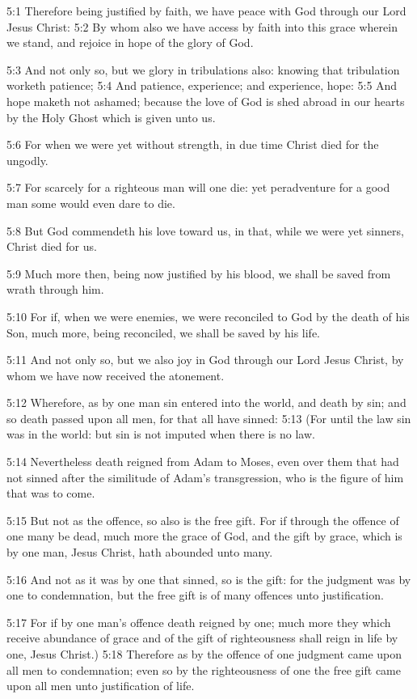 5:1 Therefore being justified by faith, we have peace with God through
our Lord Jesus Christ: 5:2 By whom also we have access by faith into
this grace wherein we stand, and rejoice in hope of the glory of God.

5:3 And not only so, but we glory in tribulations also: knowing that
tribulation worketh patience; 5:4 And patience, experience; and
experience, hope: 5:5 And hope maketh not ashamed; because the love of
God is shed abroad in our hearts by the Holy Ghost which is given unto
us.

5:6 For when we were yet without strength, in due time Christ died for
the ungodly.

5:7 For scarcely for a righteous man will one die: yet peradventure
for a good man some would even dare to die.

5:8 But God commendeth his love toward us, in that, while we were yet
sinners, Christ died for us.

5:9 Much more then, being now justified by his blood, we shall be
saved from wrath through him.

5:10 For if, when we were enemies, we were reconciled to God by the
death of his Son, much more, being reconciled, we shall be saved by
his life.

5:11 And not only so, but we also joy in God through our Lord Jesus
Christ, by whom we have now received the atonement.

5:12 Wherefore, as by one man sin entered into the world, and death by
sin; and so death passed upon all men, for that all have sinned: 5:13
(For until the law sin was in the world: but sin is not imputed when
there is no law.

5:14 Nevertheless death reigned from Adam to Moses, even over them
that had not sinned after the similitude of Adam's transgression, who
is the figure of him that was to come.

5:15 But not as the offence, so also is the free gift. For if through
the offence of one many be dead, much more the grace of God, and the
gift by grace, which is by one man, Jesus Christ, hath abounded unto
many.

5:16 And not as it was by one that sinned, so is the gift: for the
judgment was by one to condemnation, but the free gift is of many
offences unto justification.

5:17 For if by one man's offence death reigned by one; much more they
which receive abundance of grace and of the gift of righteousness
shall reign in life by one, Jesus Christ.)  5:18 Therefore as by the
offence of one judgment came upon all men to condemnation; even so by
the righteousness of one the free gift came upon all men unto
justification of life.

